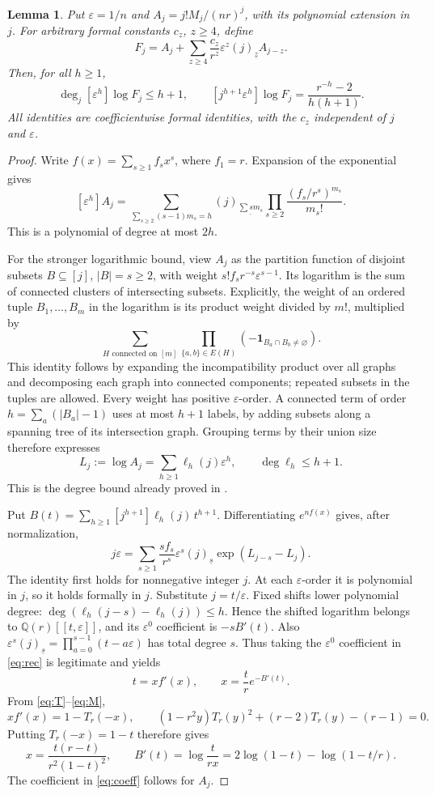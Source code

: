 \documentclass[11pt]{article}
\newtheorem{lemma}[theorem]{Lemma}
\newcommand{\eps}{\varepsilon}
\newcommand{\fall}[2]{(#1)_{\underline{#2}}}
\begin{document}
\begin{lemma}\label{lem:coeff}
Put $\eps=1/n$ and $A_j=j!M_j/(nr)^j$, with its polynomial extension
in $j$. For arbitrary formal constants $c_z$, $z\ge4$, define
\[
 F_j=A_j+\sum_{z\ge4}\frac{c_z}{r^z}\eps^z\fall{j}{z}A_{j-z}.
\]
Then, for all $h\ge1$,
\begin{equation}\label{eq:coeff}
 \deg_j[\eps^h]\log F_j\le h+1,\qquad
 [j^{h+1}\eps^h]\log F_j=\frac{r^{-h}-2}{h(h+1)}.
\end{equation}
All identities are coefficientwise formal identities, with the
$c_z$ independent of $j$ and $\eps$.
\end{lemma}
\begin{proof}
Write $f(x)=\sum_{s\ge1}f_sx^s$, where $f_1=r$.
Expansion of the exponential gives
\begin{equation}\label{eq:ah}
 [\eps^h]A_j=
 \sum_{\sum_{s\ge2}(s-1)m_s=h}
 \fall{j}{\sum s m_s}\prod_{s\ge2}
       \frac{(f_s/r^s)^{m_s}}{m_s!}.
\end{equation}
This is a polynomial of degree at most $2h$.

For the stronger logarithmic bound, view $A_j$ as the partition
function of disjoint subsets $B\subseteq[j]$, $|B|=s\ge2$, with
weight $s!f_sr^{-s}\eps^{s-1}$. Its logarithm is the sum of
connected clusters of intersecting subsets. Explicitly, the weight
of an ordered tuple $B_1,\ldots,B_m$ in the logarithm is its product
weight divided by $m!$, multiplied by
\[
 \sum_{H\text{ connected on }[m]}
 \prod_{\{a,b\}\in E(H)}(-\mathbf1_{B_a\cap B_b\ne\varnothing}).
\]
This identity follows by expanding the incompatibility product over
all graphs and decomposing each graph into connected components;
repeated subsets in the tuples are allowed. Every weight has
positive $\eps$-order. A connected term of order
$h=\sum_a(|B_a|-1)$ uses at most $h+1$ labels, by adding subsets
along a spanning tree of its intersection graph. Grouping terms by
their union size therefore expresses
\[
 L_j:=\log A_j=\sum_{h\ge1}\ell_h(j)\eps^h,
 \qquad \deg\ell_h\le h+1.
\]
This is the degree bound already proved in \cite[Theorem 3.1]{graph}.

Put $B(t)=\sum_{h\ge1}[j^{h+1}]\ell_h(j)\,t^{h+1}$.
Differentiating $e^{nf(x)}$ gives, after normalization,
\begin{equation}\label{eq:rec}
 j\eps=\sum_{s\ge1}\frac{sf_s}{r^s}\eps^s\fall{j}{s}
                  \exp(L_{j-s}-L_j).
\end{equation}
The identity first holds for nonnegative integer $j$. At each
$\eps$-order it is polynomial in $j$, so it holds formally in $j$.
Substitute $j=t/\eps$. Fixed shifts lower polynomial degree:
$\deg(\ell_h(j-s)-\ell_h(j))\le h$. Hence the shifted logarithm
belongs to $\mathbb Q(r)[[t,\eps]]$, and its $\eps^0$ coefficient
is $-sB'(t)$. Also
$\eps^s\fall{j}{s}=\prod_{a=0}^{s-1}(t-a\eps)$ has total
degree $s$. Thus taking the $\eps^0$ coefficient in \eqref{eq:rec}
is legitimate and yields
\[
 t=xf'(x),\qquad x=\frac tr e^{-B'(t)}.
\]
From \eqref{eq:T}--\eqref{eq:M},
\[
 xf'(x)=1-T_r(-x),\qquad
 (1-r^2y)T_r(y)^2+(r-2)T_r(y)-(r-1)=0.
\]
Putting $T_r(-x)=1-t$ therefore gives
\[
 x=\frac{t(r-t)}{r^2(1-t)^2},\qquad
 B'(t)=\log\frac{t}{rx}
       =2\log(1-t)-\log(1-t/r).
\]
The coefficient in \eqref{eq:coeff} follows for $A_j$.


\end{proof}
\end{document}
